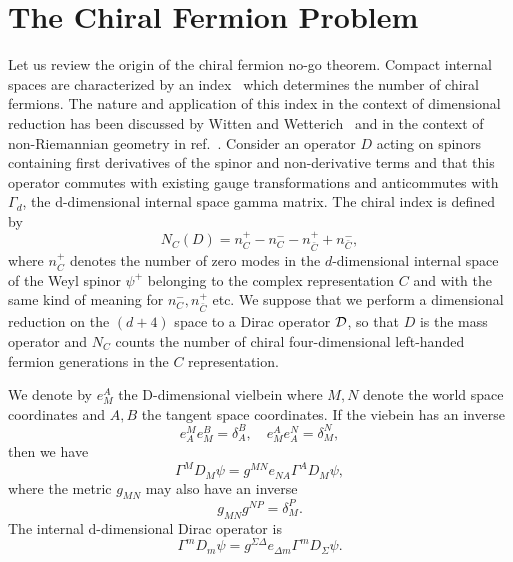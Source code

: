 \documentclass[a4paper,12pt]{article}
\begin{document}
\section{\bf The Chiral Fermion Problem}

Let us review the origin of the chiral fermion no-go theorem. Compact
internal spaces are characterized by an index~\cite{Atiyah} which
determines the number of chiral fermions. The nature and application of
this index in the context of dimensional reduction has been discussed by
Witten and Wetterich~\cite{Witten,Wetterich} and in the context of
non-Riemannian geometry in ref.~\cite{Moffat}. Consider an
operator $D$ acting on spinors containing first derivatives of
the spinor and non-derivative terms and that this operator
commutes with existing gauge transformations and anticommutes
with $\Gamma_d$, the d-dimensional internal space gamma matrix.
The chiral index is defined by
\begin{equation}
N_C(D)=n^+_C-n^-_C-n^+_{\bar C}+n^-_{\bar C},
\end{equation}
where $n^+_C$ denotes the number of zero modes in the
$d$-dimensional internal space of the Weyl spinor $\psi^+$
belonging to the complex representation $C$ and with the same
kind of meaning for $n^-_C,n^+_{\bar C}$ etc. We suppose that we
perform a dimensional reduction on the $(d+4)$ space to a Dirac
operator ${\cal D}$, so that $D$ is the mass operator and $N_C$
counts the number of chiral four-dimensional left-handed fermion
generations in the $C$ representation.

We denote by $e^A_M$ the D-dimensional vielbein where $M,N$ denote the
world space coordinates and $A,B$ the tangent space coordinates. If the
viebein has an inverse
\begin{equation}
e^M_Ae^B_M=\delta^B_A,\quad e^A_Me^N_A=\delta^N_M,
\end{equation}
then we have
\begin{equation}
\Gamma^MD_M\psi=g^{MN}e_{NA}\Gamma^AD_M\psi,
\end{equation}
where the metric $g_{MN}$ may also have an inverse
\begin{equation}
g_{MN}g^{NP}=\delta_M^P.
\end{equation}
The internal d-dimensional Dirac operator is
\begin{equation}
\Gamma^mD_m\psi=g^{\Sigma\Delta}e_{\Delta m}\Gamma^mD_\Sigma\psi.
\end{equation}
\end{document}
